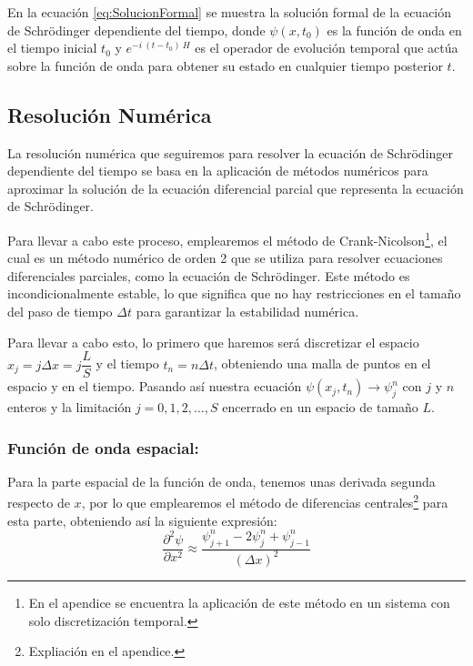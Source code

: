 \documentclass[10pt,onecolumn]{article}
\begin{document}
En la ecuación \ref{eq:SolucionFormal} se muestra la solución formal de la ecuación de Schrödinger dependiente del tiempo, donde $\psi(x,t_0)$ es la función de onda en el tiempo inicial $t_0$ y $e^{-i\ (t-t_0)\  H}$ es el operador de evolución temporal que actúa sobre la función de onda para obtener su estado en cualquier tiempo posterior $t$.

\subsection{Resolución Numérica}

La resolución numérica que seguiremos para resolver la ecuación de Schrödinger dependiente del tiempo se basa en la aplicación de métodos numéricos para aproximar la solución de la ecuación diferencial parcial que representa la ecuación de Schrödinger.


Para llevar a cabo este proceso, emplearemos el método de Crank-Nicolson\footnote{En el apendice se encuentra la aplicación de este método en un sistema con solo discretización temporal.}, el cual es un método numérico de orden 2 que se utiliza para resolver ecuaciones diferenciales parciales, como la ecuación de Schrödinger. Este método es incondicionalmente estable, lo que significa que no hay restricciones en el tamaño del paso de tiempo $\Delta t$ para garantizar la estabilidad numérica. 


Para llevar a cabo esto, lo primero que haremos será discretizar el espacio $x_j = j\Delta x = j \dfrac{L}{S}$ y el tiempo $t_n = n\Delta t$, obteniendo una malla de puntos en el espacio y en el tiempo. Pasando así nuestra ecuación $\psi(x_j,t_n) \rightarrow \psi_{j}^{n}$ con $j$ y $n$ enteros y la limitación $j = 0, 1, 2, \ldots, S$ encerrado en un espacio de tamaño $L$.

\subsubsection{Función de onda espacial:}

Para la parte espacial de la función de onda, tenemos unas derivada segunda respecto de $x$, por lo que emplearemos el método de diferencias centrales\footnote{Expliación en el apendice.} para esta parte, obteniendo así la siguiente expresión:
\begin{equation}
    \dfrac{\partial^2 \psi}{\partial x^2} \approx \dfrac{\psi_{j+1}^{n} - 2\psi_{j}^{n} + \psi_{j-1}^{n}}{(\Delta x)^2}
\end{equation}
\end{document}
